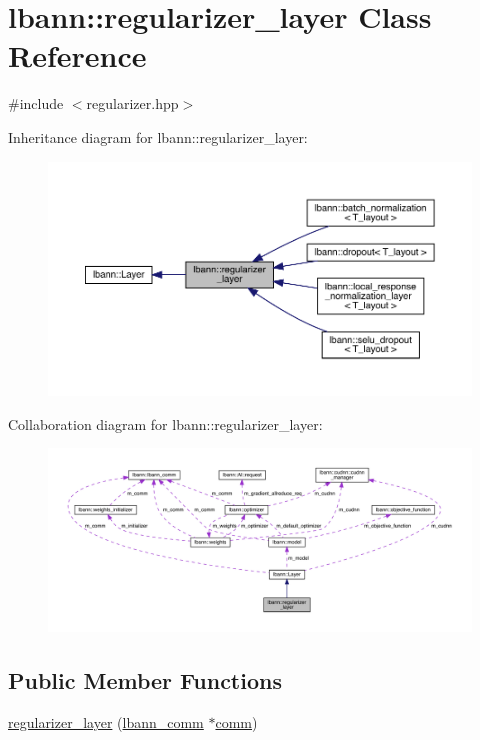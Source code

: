 \hypertarget{classlbann_1_1regularizer__layer}{}\section{lbann\+:\+:regularizer\+\_\+layer Class Reference}
\label{classlbann_1_1regularizer__layer}


{\ttfamily \#include $<$regularizer.\+hpp$>$}



Inheritance diagram for lbann\+:\+:regularizer\+\_\+layer\+:\nopagebreak
\begin{figure}[H]
\begin{center}
\leavevmode
\includegraphics[width=350pt]{classlbann_1_1regularizer__layer__inherit__graph}
\end{center}
\end{figure}


Collaboration diagram for lbann\+:\+:regularizer\+\_\+layer\+:\nopagebreak
\begin{figure}[H]
\begin{center}
\leavevmode
\includegraphics[width=350pt]{classlbann_1_1regularizer__layer__coll__graph}
\end{center}
\end{figure}
\subsection*{Public Member Functions}
\begin{DoxyCompactItemize}
\item 
\hyperlink{classlbann_1_1regularizer__layer_a2ebf3877b905b479a0250b74cf8f68b3}{regularizer\+\_\+layer} (\hyperlink{classlbann_1_1lbann__comm}{lbann\+\_\+comm} $\ast$\hyperlink{file__io_8cpp_ab048c6f9fcbcfaa57ce68b00263dbebe}{comm})
\end{DoxyCompactItemize}
